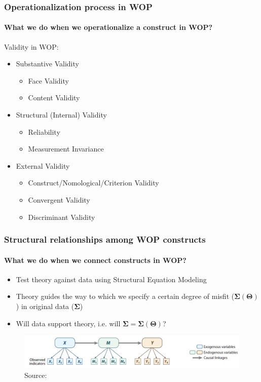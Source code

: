 \documentclass{beamer}
\begin{document}
\begin{frame}
\frametitle{Operationalization process in WOP}
\framesubtitle{What we do when we operationalize a construct in WOP?}
	Validity in WOP:
	\begin{itemize}
		\item Substantive Validity
		\begin{itemize}
			\item Face Validity {\scriptsize \parencite{allen2023face}}
			\item Content Validity {\scriptsize \parencite{colquitt2019content, rossiter2008content}}
		\end{itemize}
		\item Structural (Internal) Validity
		\begin{itemize}
			\item Reliability {\scriptsize \parencite{cortina2020alpha}}
			\item Measurement Invariance {\scriptsize \parencite{somaraju2022measurInvar}}
		\end{itemize}
		\item External Validity
		    \begin{itemize}
		    	\item Construct/Nomological/Criterion Validity {\scriptsize \parencite[e.g.,][]{lambert2023ConstrVal}}
		    	\item Convergent Validity {\scriptsize \parencite{cheung2024validity}}
		    	\item Discriminant Validity {\scriptsize \parencite{cheung2024validity, ronkko2022}}
		\end{itemize}
	\end{itemize}	
\end{frame}


\begin{frame}
	\frametitle{Structural relationships among WOP constructs}
	\framesubtitle{What we do when we connect constructs in WOP?}
	
	\begin{itemize}
		\item Test theory against data using Structural Equation Modeling
        \item Theory guides the way to which we specify a certain degree of misfit ($\mathbf{\Sigma(\Theta)}$) in original data (\(\mathbf{\Sigma}\))
        \item Will data support theory, i.e. will $\mathbf{\Sigma} = \mathbf{\Sigma}(\bm{\Theta})$?{\scriptsize \parencite{bollen1989}}
    \end{itemize}
 
 \begin{figure}[htbp]
 	\centering
 	\includegraphics[width=1.05\linewidth]{figs/zyphurSEM.png}
 	\caption{Source: \textcite[p. 497]{zyphur2023structural}}
 	\label{fig:sem}
 \end{figure}
\end{frame}
\end{document}
